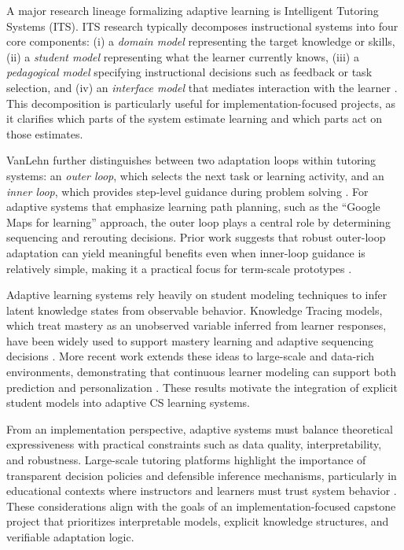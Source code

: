 \documentclass{article}
\begin{document}
A major research lineage formalizing adaptive learning is Intelligent Tutoring
Systems (ITS). ITS research typically decomposes instructional systems into four
core components: (i) a \textit{domain model} representing the target knowledge or
skills, (ii) a \textit{student model} representing what the learner currently
knows, (iii) a \textit{pedagogical model} specifying instructional decisions such
as feedback or task selection, and (iv) an \textit{interface model} that mediates
interaction with the learner \cite{woolf2009,vanlehn2006}. This decomposition is
particularly useful for implementation-focused projects, as it clarifies which
parts of the system estimate learning and which parts act on those estimates.

VanLehn further distinguishes between two adaptation loops within tutoring
systems: an \textit{outer loop}, which selects the next task or learning activity,
and an \textit{inner loop}, which provides step-level guidance during problem
solving \cite{vanlehn2006}. For adaptive systems that emphasize learning path
planning, such as the ``Google Maps for learning'' approach, the outer loop plays
a central role by determining sequencing and rerouting decisions. Prior work
suggests that robust outer-loop adaptation can yield meaningful benefits even
when inner-loop guidance is relatively simple, making it a practical focus for
term-scale prototypes \cite{vanlehn2006,woolf2009}.

Adaptive learning systems rely heavily on student modeling techniques to infer
latent knowledge states from observable behavior. Knowledge Tracing models, which
treat mastery as an unobserved variable inferred from learner responses, have been
widely used to support mastery learning and adaptive sequencing decisions
\cite{corbett1995}. More recent work extends these ideas to large-scale and
data-rich environments, demonstrating that continuous learner modeling can
support both prediction and personalization \cite{piech2015dkt}. These results
motivate the integration of explicit student models into adaptive CS learning
systems.

From an implementation perspective, adaptive systems must balance theoretical
expressiveness with practical constraints such as data quality, interpretability,
and robustness. Large-scale tutoring platforms highlight the importance of
transparent decision policies and defensible inference mechanisms, particularly
in educational contexts where instructors and learners must trust system behavior
\cite{feng2014assistments}. These considerations align with the goals of an
implementation-focused capstone project that prioritizes interpretable models,
explicit knowledge structures, and verifiable adaptation logic.
\end{document}
